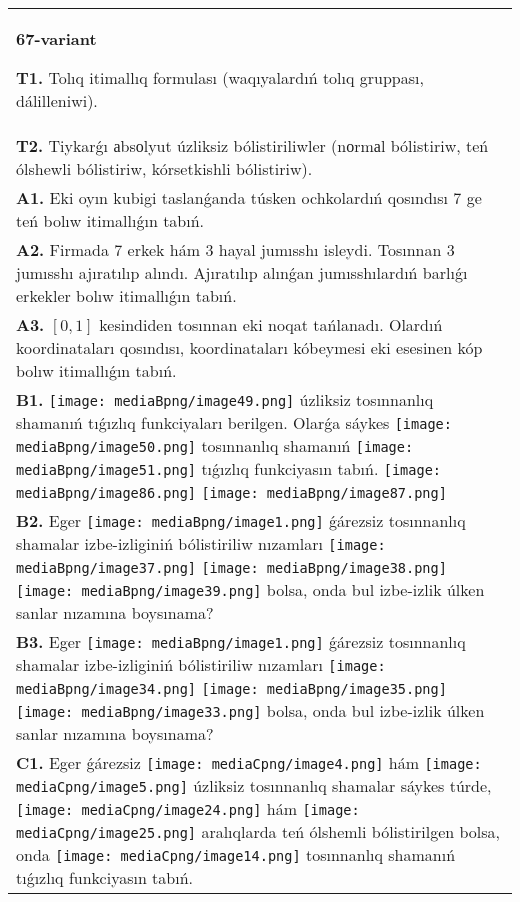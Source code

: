\documentclass{article}
\begin{document}
\begin{tabular}{m{17cm}}
\textbf{67-variant}
\newline

\textbf{T1.} Tolıq itimallıq formulası (waqıyalardıń tolıq gruppası, dálilleniwi).
 \\
\textbf{T2.} Tiykarǵı аbsоlyut úzliksiz bólistiriliwler (nоrmаl bólistiriw, teń ólshewli bólistiriw, kórsetkishli bólistiriw). 
 \\
\textbf{A1.} Eki oyın kubigi taslanǵanda túsken ochkolardıń qosındısı 7 ge teń bolıw itimallıǵın tabıń.
 \\
\textbf{A2.} Firmada 7 erkek hám 3 hayal jumısshı isleydi. Tosınnan 3 jumısshı ajıratılıp alındı. Ajıratılıp alınǵan jumısshılardıń barlıǵı erkekler bolıw itimallıǵın tabıń.
 \\
\textbf{A3.} $\left[ 0,1 \right]$ kesindiden tosınnan eki noqat tańlanadı. Olardıń koordinataları qosındısı, koordinataları kóbeymesi eki esesinen kóp bolıw itimallıǵın tabıń.
 \\
\textbf{B1.} \texttt{[image: mediaBpng/image49.png]} úzliksiz tosınnanlıq shamanıń tıǵızlıq funkciyaları berilgen. Olarǵa sáykes \texttt{[image: mediaBpng/image50.png]} tosınnanlıq shamanıń \texttt{[image: mediaBpng/image51.png]} tıǵızlıq funkciyasın tabıń. \texttt{[image: mediaBpng/image86.png]} \texttt{[image: mediaBpng/image87.png]}
 \\
\textbf{B2.} Eger \texttt{[image: mediaBpng/image1.png]} ǵárezsiz tosınnanlıq shamalar izbe-izliginiń bólistiriliw nızamları
\texttt{[image: mediaBpng/image37.png]} \texttt{[image: mediaBpng/image38.png]} \texttt{[image: mediaBpng/image39.png]}
bolsa, onda bul izbe-izlik úlken sanlar nızamına boysınama?
 \\
\textbf{B3.} Eger \texttt{[image: mediaBpng/image1.png]} ǵárezsiz tosınnanlıq shamalar izbe-izliginiń bólistiriliw nızamları
\texttt{[image: mediaBpng/image34.png]} \texttt{[image: mediaBpng/image35.png]} \texttt{[image: mediaBpng/image33.png]}
bolsa, onda bul izbe-izlik úlken sanlar nızamına boysınama?
 \\
\textbf{C1.} Eger ǵárezsiz \texttt{[image: mediaCpng/image4.png]} hám \texttt{[image: mediaCpng/image5.png]} úzliksiz tosınnanlıq shamalar sáykes túrde, \texttt{[image: mediaCpng/image24.png]} hám \texttt{[image: mediaCpng/image25.png]} aralıqlarda teń ólshemli bólistirilgen bolsa, onda \texttt{[image: mediaCpng/image14.png]} tosınnanlıq shamanıń tıǵızlıq funkciyasın tabıń.

\end{tabular}
\end{document}
